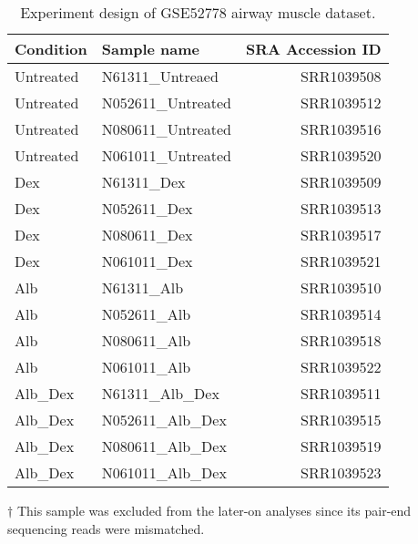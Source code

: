 \begin{table}[!htbp]
    \caption[Experiment design of GSE52778 airway muscle dataset]{
        Experiment design of GSE52778 airway muscle dataset.
    }
    \label{tab:dataset-airway}
    \centering
    \begin{threeparttable}
        \begin{tabular}{llr}
            \toprule
            Condition & Sample name & SRA Accession ID \\
            \midrule
            Untreated & N61311\_Untreaed   & SRR1039508 \\
            Untreated & N052611\_Untreated & SRR1039512 \\
            Untreated & N080611\_Untreated & SRR1039516 \\
            Untreated & N061011\_Untreated & SRR1039520 \\

            Dex       & N61311\_Dex        & SRR1039509 \\
            Dex       & N052611\_Dex       & SRR1039513 \\
            Dex       & N080611\_Dex       & SRR1039517 \\
            Dex       & N061011\_Dex       & SRR1039521 \\

            Alb       & N61311\_Alb        & SRR1039510 \\
            Alb       & N052611\_Alb       & SRR1039514 \\
            Alb       & N080611\_Alb       & SRR1039518 \\
            Alb       & N061011\_Alb       & SRR1039522 \\

            Alb\_Dex  & N61311\_Alb\_Dex   & SRR1039511 \\
            Alb\_Dex  & N052611\_Alb\_Dex\tnote{$\dagger$} & SRR1039515\tnote{$\dagger$} \\
            Alb\_Dex  & N080611\_Alb\_Dex  & SRR1039519 \\
            Alb\_Dex  & N061011\_Alb\_Dex  & SRR1039523 \\
            \bottomrule
        \end{tabular}
        \begin{tablenotes}
        \item[$\dagger$] This sample was excluded from the later-on analyses
            since its pair-end sequencing reads were mismatched.
        \end{tablenotes}
    \end{threeparttable}
\end{table}
